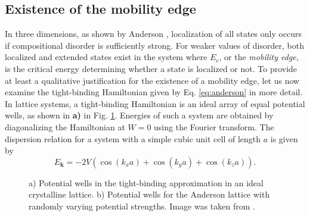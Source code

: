 \documentclass[10pt,a4paper]{article}
\begin{document}
\subsection{Existence of the mobility edge}
\begin{minipage}[t]{0.5\textwidth} 
In three dimensions, as shown by Anderson \cite{Anderson}, localization of all states only occurs if compositional disorder is sufficiently strong. For weaker values of disorder, both localized and extended states exist in the system where $E_c$, or the \emph{mobility edge}, is the critical energy determining whether a state is localized or not. To provide at least a qualitative justification for the existence of a mobility edge, let us now examine the tight-binding Hamiltonian given by Eq. \eqref{eq:anderson} in more detail. In lattice systems, a tight-binding Hamiltonian is an ideal array of equal potential wells, as shown in \textbf{a)} in Fig. \ref{fig:band_structure}. Energies of such a system are obtained by diagonalizing the Hamiltonian at $W=0$ using the Fourier transform. The dispersion relation for a system with a simple cubic unit cell of length $a$ is given by
\begin{equation}\label{eq:dispersion_crystal}
E_\textbf{k}=-2V\left(\cos(k_x a) +\cos(k_y a) +\cos(k_z a)\right).
\end{equation}
\end{minipage}\hfill
\begin{minipage}[t]{0.45\textwidth} 
\begin{figure}[H]
\caption{a) Potential wells in the tight-binding approximation in an ideal crystalline lattice. b) Potential wells for the Anderson lattice with randomly varying potential strengths. Image was taken from \cite{Mott}.  }
\label{fig:band_structure} 
\end{figure}
\end{minipage}\\\\
\end{document}
